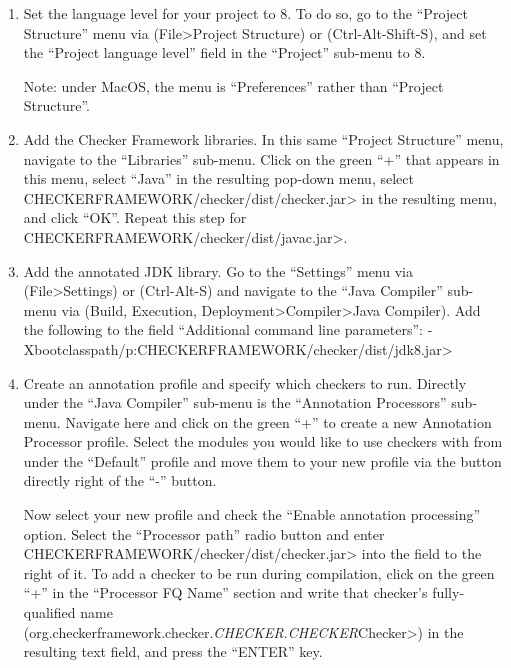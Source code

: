 \begin{enumerate}

\item
  Set the language level for your project to 8.  To do so, go to the
  ``Project Structure'' menu via (File>Project Structure) or
  (Ctrl-Alt-Shift-S), and set the ``Project language level'' field in the
  ``Project'' sub-menu to 8.

  Note: under MacOS, the menu is ``Preferences'' rather than ``Project Structure''.

\item
  Add the Checker Framework libraries.  In this same ``Project Structure''
  menu, navigate to the ``Libraries'' sub-menu.  Click on the green ``+'' that
  appears in this menu, select ``Java'' in the resulting pop-down menu,
  select \<CHECKERFRAMEWORK/checker/dist/checker.jar> in the resulting menu,
  and click ``OK''. Repeat this step for
  \<CHECKERFRAMEWORK/checker/dist/javac.jar>.

\item
  Add the annotated JDK library.
  Go to the ``Settings'' menu via (File>Settings) or (Ctrl-Alt-S) and
  navigate to the ``Java Compiler'' sub-menu via (Build, Execution,
  Deployment>Compiler>Java Compiler).  Add the following to the field
  ``Additional command line parameters'':
  \<-Xbootclasspath/p:CHECKERFRAMEWORK/checker/dist/jdk8.jar>

\item
  Create an annotation profile and specify which checkers to run.
  Directly under the ``Java Compiler'' sub-menu is the ``Annotation
  Processors'' sub-menu. Navigate here and click on the green ``+'' to create
  a new Annotation Processor profile. Select the modules you would like to
  use checkers with from under the ``Default'' profile and move them to your
  new profile via the button directly right of the ``-'' button.

  Now select your new profile and check the ``Enable annotation processing''
  option. Select the ``Processor path'' radio button and enter
  \<CHECKERFRAMEWORK/checker/dist/checker.jar> into the field to the right
  of it. To add a checker to be run during compilation, click on the green
  ``+'' in the ``Processor FQ Name'' section and write that checker's
  fully-qualified name
  (\<org.checkerframework.checker.\emph{CHECKER}.\emph{CHECKER}Checker>) in
  the resulting text field, and press the ``ENTER'' key.

\end{enumerate}

